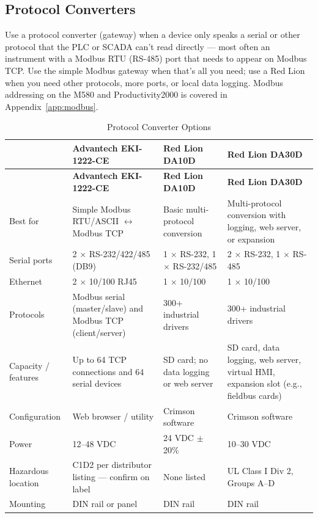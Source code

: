 \subsection{Protocol Converters}\label{sec:protocol-converters}
Use a protocol converter (gateway) when a device only speaks a serial or other protocol that the PLC or SCADA can't read directly --- most often an instrument with a Modbus RTU (RS-485) port that needs to appear on Modbus TCP. Use the simple Modbus gateway when that's all you need; use a Red Lion when you need other protocols, more ports, or local data logging. Modbus addressing on the M580 and Productivity2000 is covered in Appendix~\ref{app:modbus}.

\begin{longtable}{@{}P{3.22cm}P{4.00cm}P{4.00cm}P{4.00cm}@{}}
\caption{Protocol Converter Options}\label{tab:protocol-converters} \\
\toprule
{} & \textbf{Advantech EKI-1222-CE} & \textbf{Red Lion DA10D} & \textbf{Red Lion DA30D} \\
\midrule
\endfirsthead
\toprule
{} & \textbf{Advantech EKI-1222-CE} & \textbf{Red Lion DA10D} & \textbf{Red Lion DA30D} \\
\midrule
\endhead
Best for & Simple Modbus RTU/ASCII $\leftrightarrow$ Modbus TCP & Basic multi-protocol conversion & Multi-protocol conversion with logging, web server, or expansion \\
Serial ports & 2 $\times$ RS-232/422/485 (DB9) & 1 $\times$ RS-232, 1 $\times$ RS-232/485 & 2 $\times$ RS-232, 1 $\times$ RS-485 \\
Ethernet & 2 $\times$ 10/100 RJ45 & 1 $\times$ 10/100 & 1 $\times$ 10/100 \\
Protocols & Modbus serial (master/slave) and Modbus TCP (client/server) & 300+ industrial drivers & 300+ industrial drivers \\
Capacity / features & Up to 64 TCP connections and 64 serial devices & SD card; no data logging or web server & SD card, data logging, web server, virtual HMI, expansion slot (e.g., fieldbus cards) \\
Configuration & Web browser / utility & Crimson software & Crimson software \\
Power & 12--48 VDC & 24 VDC $\pm$20\% & 10--30 VDC \\
Hazardous location & C1D2 per distributor listing --- confirm on label & None listed & UL Class I Div 2, Groups A--D \\
Mounting & DIN rail or panel & DIN rail & DIN rail \\

\end{longtable}

